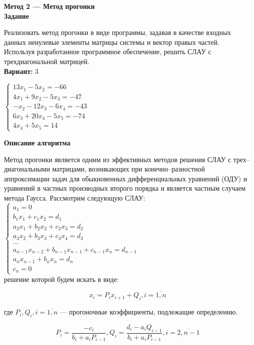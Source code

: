 \textbf{Метод 2 --- Метод прогонки}\\

\textbf{Задание}

Реализовать метод прогонки в виде программы, задавая в качестве входных данных ненулевые элементы матрицы системы и вектор правых частей. Используя разработанное программное обеспечение, решить СЛАУ с трехдиагональной матрицей.\\

\textbf{Вариант:} 3

$
\begin{cases}
13x_1-5x_2=-66\\
4x_1+9x_2-5x_3=-47\\
-x_2-12x_3-6x_4=-43\\
6x_3+20x_4-5x_5=-74\\
4x_4+5x_5=14
\end{cases}
$
\vspace{0.5cm}

\textbf{Описание алгоритма}

Метод прогонки является одним из эффективных методов решения СЛАУ с трех--диагональными матрицами, возникающих при конечно--разностной аппроксимации задач для обыкновенных дифференциальных уравнений (ОДУ) и уравнений в частных производных второго порядка и является частным случаем метода Гаусса. Рассмотрим следующую СЛАУ:\\

$
\begin{cases}
a_1=0\\
b_1x_1+c_1x_2=d_1\\
a_2x_1+b_2x_2+c_2x_3=d_2\\
a_3x_2+b_3x_3+c_3x_4=d_3\\
...\\
a_{n-1}x_{n-2}+b_{n-1}x_{n-1}+c_{n-1}x_n=d_{n-1}\\
a_nx_{n-1}+b_nx_n=d_n\\
c_n=0
\end{cases}
$\\

решение которой будем искать в виде:

\begin{equation}
x_i=P_ix_{i+1}+Q_i, i=\overline{1,n}
\end{equation}

где $P_i, Q_i, i=\overline{1,n}$ --- прогоночные коэффициенты, подлежащие определению.

$$
P_i=\frac{-c_i}{b_i+a_iP_{i-1}}, Q_i=\frac{d_i-a_iQ_{i-1}}{b_i+a_iP_{i-1}}, i=\overline{2,n-1}
$$

